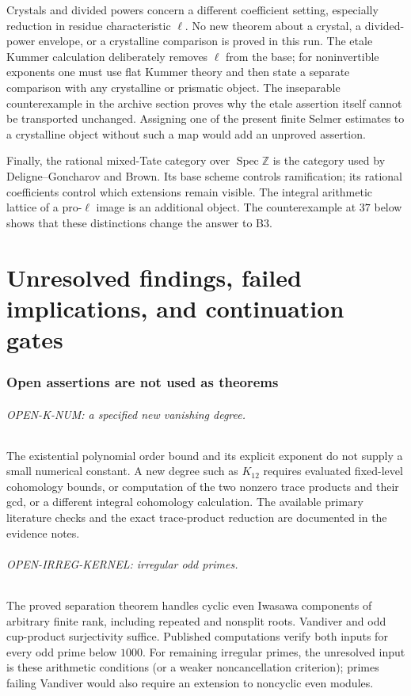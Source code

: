 \documentclass[11pt,a4paper]{article}
\theoremstyle{definition}
\begin{document}
Crystals and divided powers concern a different coefficient setting,
especially reduction in residue characteristic $\ell$. No new theorem
about a crystal, a divided-power envelope, or a crystalline comparison
is proved in this run. The etale Kummer calculation deliberately removes
$\ell$ from the base; for noninvertible exponents one must use flat
Kummer theory and then state a separate comparison with any crystalline
or prismatic object. The inseparable counterexample in the archive
section proves why the etale assertion itself cannot be transported
unchanged. Assigning one of the present finite Selmer estimates to a
crystalline object without such a map would add an unproved assertion.

Finally, the rational mixed-Tate category over $\operatorname{Spec}
\mathbb Z$ is the category used by Deligne--Goncharov and Brown. Its
base scheme controls ramification; its rational coefficients control
which extensions remain visible. The integral arithmetic lattice of a
pro-$\ell$ image is an additional object. The counterexample at $37$
below shows that these distinctions change the answer to B3.



\clearpage
\part{Unresolved findings, failed implications, and continuation gates}
\section{Open assertions are not used as theorems}

\paragraph{OPEN-K-NUM: a specified new vanishing degree.}
The existential polynomial order bound and its explicit exponent do
not supply a small numerical constant. A new degree such as $K_{12}$
requires evaluated fixed-level cohomology bounds, or computation of the
two nonzero trace products and their gcd, or a different integral
cohomology calculation. The available primary literature checks and
the exact trace-product reduction are documented in the evidence notes.

\paragraph{OPEN-IRREG-KERNEL: irregular odd primes.}
The proved separation theorem handles cyclic even Iwasawa components of
arbitrary finite rank, including repeated and nonsplit roots. Vandiver
and odd cup-product surjectivity suffice. Published computations verify
both inputs for every odd prime below $1000$. For remaining irregular
primes, the unresolved input is these arithmetic conditions (or a
weaker noncancellation criterion); primes failing Vandiver would also
require an extension to noncyclic even modules.
\end{document}
